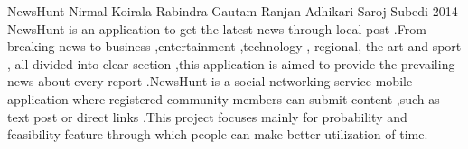  \begin{conf-abstract}[]
{NewsHunt}
{Nirmal Koirala
Rabindra Gautam
Ranjan Adhikari
Saroj Subedi}
{2014}
NewsHunt is an application to get the latest news through local post .From breaking news to business 
,entertainment ,technology , regional, the art and sport , all divided into clear section ,this application is aimed to provide the prevailing news about every report .NewsHunt is a social networking service mobile application where registered community members can submit content ,such as text post or direct links .This project focuses mainly for probability and feasibility feature through which people can make better utilization of time.
  \end{conf-abstract}